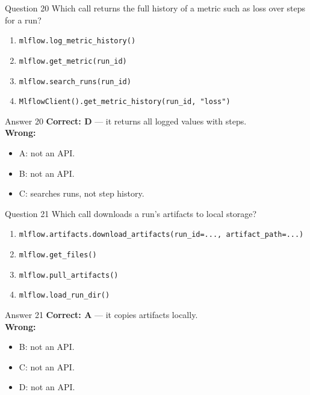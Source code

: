 \documentclass[aspectratio=169,11pt]{beamer}
\begin{document}
\begin{frame}{Question 20}
Which call returns the full history of a metric such as loss over steps for a run?
\begin{enumerate}[label=\Alph*.]
\item \texttt{mlflow.log\_metric\_history()}
\item \texttt{mlflow.get\_metric(run\_id)}
\item \texttt{mlflow.search\_runs(run\_id)}
\item \texttt{MlflowClient().get\_metric\_history(run\_id, "loss")}
\end{enumerate}
\end{frame}
\begin{frame}{Answer 20}
\textbf{Correct: D} --- it returns all logged values with steps.\\
\vspace{0.5em}
\textbf{Wrong:}
\begin{itemize}
\item A: not an API.
\item B: not an API.
\item C: searches runs, not step history.
\end{itemize}
\end{frame}

\begin{frame}{Question 21}
Which call downloads a run's artifacts to local storage?
\begin{enumerate}[label=\Alph*.]
\item \texttt{mlflow.artifacts.download\_artifacts(run\_id=..., artifact\_path=...)}
\item \texttt{mlflow.get\_files()}
\item \texttt{mlflow.pull\_artifacts()}
\item \texttt{mlflow.load\_run\_dir()}
\end{enumerate}
\end{frame}
\begin{frame}{Answer 21}
\textbf{Correct: A} --- it copies artifacts locally.\\
\vspace{0.5em}
\textbf{Wrong:}
\begin{itemize}
\item B: not an API.
\item C: not an API.
\item D: not an API.
\end{itemize}
\end{frame}
\end{document}
